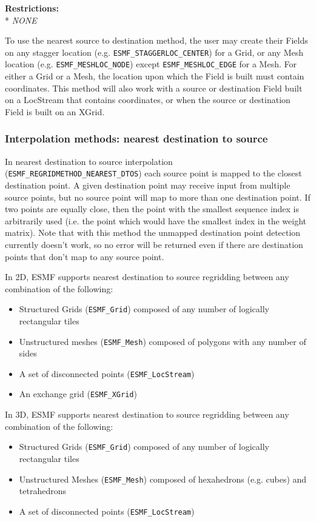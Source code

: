 \smallskip

\textbf{Restrictions:}\\*
\textit{NONE}

\smallskip

 To use the nearest source to destination method, the user may create their Fields on any stagger location (e.g. {\tt ESMF\_STAGGERLOC\_CENTER}) for a Grid, or
 any Mesh location (e.g. {\tt ESMF\_MESHLOC\_NODE}) except {\tt ESMF\_MESHLOC\_EDGE} for a Mesh. For either a Grid or a Mesh, the location upon which the Field is built 
 must contain coordinates. This method will also work with a source or destination Field built on a LocStream that contains coordinates, or when the source 
or destination Field is built on an XGrid.


\subsubsection{Interpolation methods: nearest destination to source}\label{sec:interpolation:nearestdtos}
In nearest destination to source interpolation ({\tt ESMF\_REGRIDMETHOD\_NEAREST\_DTOS}) each source point is mapped to the closest destination point. A given destination point may receive input from multiple source points, but no source point will map to more than one destination point. If two points are equally close, then the point with the smallest sequence index is arbitrarily used (i.e. the point which would have the smallest index in the weight matrix). Note that with this method the unmapped destination point detection currently doesn't work, so no error will be returned even if there are destination points that don't map to any source point. 

\smallskip

 In 2D, ESMF supports nearest destination to source regridding between any combination of the following:
 \begin{itemize}
 \item Structured Grids ({\tt ESMF\_Grid}) composed of any number of logically rectangular tiles
 \item Unstructured meshes ({\tt ESMF\_Mesh}) composed of polygons with any number of sides
 \item A set of disconnected points ({\tt ESMF\_LocStream}) 
 \item An exchange grid ({\tt ESMF\_XGrid})
 \end{itemize}

\smallskip

 In 3D, ESMF supports nearest destination to source regridding between any combination of the following:
 \begin{itemize}
 \item Structured Grids ({\tt ESMF\_Grid}) composed of any number of logically rectangular tiles
 \item Unstructured Meshes ({\tt ESMF\_Mesh}) composed of hexahedrons (e.g. cubes) and tetrahedrons
 \item A set of disconnected points ({\tt ESMF\_LocStream}) 
 \end{itemize}

